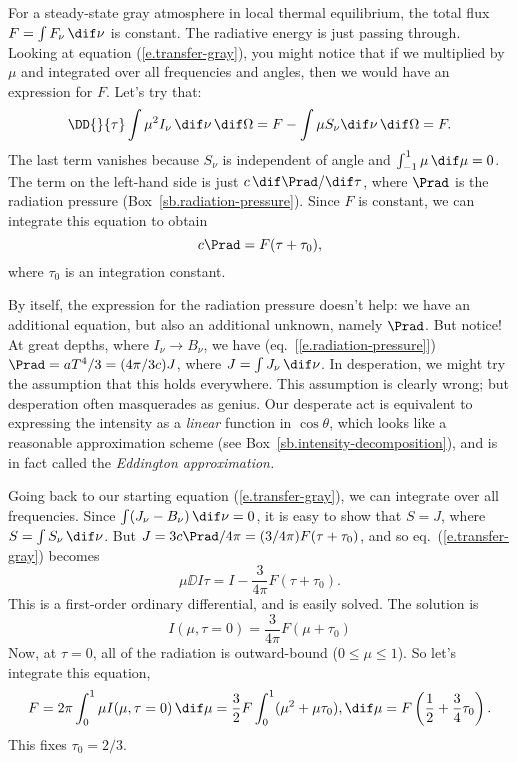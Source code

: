  For a steady-state gray atmosphere in local thermal equilibrium, the total flux $F = \int F_{\nu}\,\dif\nu$ is constant. The radiative energy is just passing through. Looking at equation (\ref{e.transfer-gray}), you might notice that if we multiplied by $\mu$ and integrated over all frequencies and angles, then we would have an expression for $F$. Let's try that:
\[
	\DD{}{\tau}\int\mu^{2}I_{\nu}\,\dif\nu\,\dif\Omega = F - \int \mu S_{\nu}\dif\nu\,\dif\Omega = F.
\]
The last term vanishes because $S_{\nu}$ is independent of angle and $\int_{-1}^{1} \mu\,\dif\mu = 0$.  The term on the left-hand side is just $c\,\dif\Prad/\dif\tau$, where $\Prad$ is the radiation pressure (Box~\ref{sb.radiation-pressure}). Since $F$ is constant, we can integrate this equation to obtain
\[
	c\Prad = F(\tau + \tau_{0}),
\]
where $\tau_{0}$ is an integration constant.

By itself, the expression for the radiation pressure doesn't help: we have an additional equation, but also an additional unknown, namely $\Prad$. But notice! At great depths, where $I_{\nu}\to B_{\nu}$, we have (eq.~[\ref{e.radiation-pressure}]) $\Prad = aT^{4}/3 = (4\pi/3c)J$, where $J=\int J_{\nu}\,\dif\nu$. In desperation, we might try the assumption that this holds everywhere. This assumption is clearly wrong; but desperation often masquerades as genius. Our desperate act is equivalent to expressing the intensity as a \emph{linear} function in $\cos\theta$, which looks like a reasonable approximation scheme (see Box~\ref{sb.intensity-decomposition}), and is in fact called the \emph{Eddington approximation.}

Going back to our starting equation (\ref{e.transfer-gray}), we can integrate over all frequencies. Since $\int(J_{\nu}-B_{\nu})\,\dif\nu = 0$, it is easy to show that $S = J$, where $S=\int S_{\nu}\,\dif\nu$. But $J = 3c\Prad/4\pi = (3/4\pi)F(\tau + \tau_{0})$, and so eq.~(\ref{e.transfer-gray}) becomes
\[
	\mu \DD{I}{\tau} = I -\frac{3}{4\pi} F (\tau +\tau_{0}).
\]
This is a first-order ordinary differential, and is easily solved. The solution is
\[
	I(\mu,\tau=0) = \frac{3}{4\pi}F(\mu + \tau_{0})
\]
Now, at $\tau=0$, all of the radiation is outward-bound ($0\le\mu\le 1$). So let's integrate this equation,
\[
	F = 2\pi\int_{0}^{1}\mu I(\mu,\tau=0)\,\dif\mu = \frac{3}{2}F\int_{0}^{1} (\mu^{2} + \mu\tau_{0}),\dif\mu = F\left(\frac{1}{2} + \frac{3}{4}\tau_{0}\right).
\]
This fixes $\tau_{0} = 2/3$.

